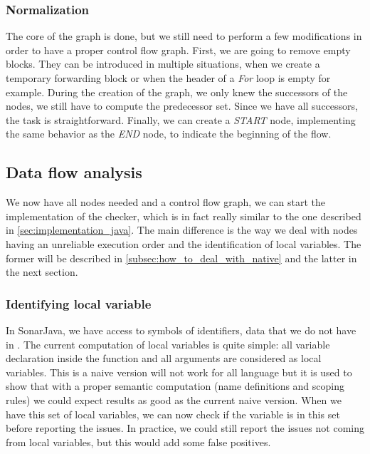 \subsubsection{Normalization}
\label{subsubsec:normalization_cfg}
The core of the graph is done, but we still need to perform a few modifications in order to have a proper control flow graph. 
First, we are going to remove empty blocks. 
They can be introduced in multiple situations, when we create a temporary forwarding block or when the header of a \emph{For} loop is empty for example.
During the creation of the graph, we only knew the successors of the nodes, we still have to compute the predecessor set. 
Since we have all successors, the task is straightforward. 
Finally, we can create a \emph{START} node, implementing the same behavior as the \emph{END} node, to indicate the beginning of the flow.

\subsection{Data flow analysis}
\label{subsec:data_flow_analysis}

We now have all nodes needed and a control flow graph, we can start the implementation of the checker, which is in fact really similar to the one described in \ref{sec:implementation_java}. 
The main difference is the way we deal with nodes having an unreliable execution order and the identification of local variables.
The former will be described in \ref{subsec:how_to_deal_with_native} and the latter in the next section.

\subsubsection{Identifying local variable}
\label{subsubsec:identifying_local_variable}

In SonarJava, we have access to symbols of identifiers, data that we do not have in \slang{}. 
The current computation of local variables is quite simple: all variable declaration inside the function and all arguments are considered as local variables.
This is a naive version will not work for all language but it is used to show that with a proper semantic computation (name definitions and scoping rules) we could expect results as good as the current naive version. \newline
When we have this set of local variables, we can now check if the variable is in this set before reporting the issues. 
In practice, we could still report the issues not coming from local variables, but this would add some false positives.

